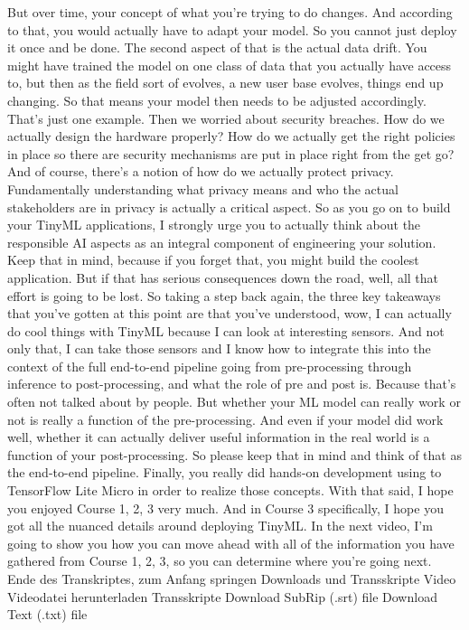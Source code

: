     But over time, your concept of what you're trying to do changes.
    And according to that, you would actually have to adapt your model.
    So you cannot just deploy it once and be done.
    The second aspect of that is the actual data drift.
    You might have trained the model on one class of data
    that you actually have access to, but then as the field sort of evolves,
    a new user base evolves, things end up changing.
    So that means your model then needs to be adjusted accordingly.
    That's just one example.
    Then we worried about security breaches.
    How do we actually design the hardware properly?
    How do we actually get the right policies in place
    so there are security mechanisms are put in place right from the get go?
    And of course, there's a notion of how do we actually protect privacy.
    Fundamentally understanding what privacy means
    and who the actual stakeholders are in privacy is actually a critical aspect.
    So as you go on to build your TinyML applications,
    I strongly urge you to actually think about the responsible AI aspects
    as an integral component of engineering your solution.
    Keep that in mind, because if you forget that,
    you might build the coolest application.
    But if that has serious consequences down the road,
    well, all that effort is going to be lost.
    So taking a step back again, the three key takeaways
    that you've gotten at this point are that you've understood,
    wow, I can actually do cool things with TinyML
    because I can look at interesting sensors.
    And not only that, I can take those sensors
    and I know how to integrate this into the context
    of the full end-to-end pipeline going from pre-processing
    through inference to post-processing, and what the role of pre and post is.
    Because that's often not talked about by people.
    But whether your ML model can really work or not is really
    a function of the pre-processing.
    And even if your model did work well, whether it can actually
    deliver useful information in the real world
    is a function of your post-processing.
    So please keep that in mind and think of that as the end-to-end pipeline.
    Finally, you really did hands-on development
    using to TensorFlow Lite Micro in order to realize those concepts.
    With that said, I hope you enjoyed Course 1, 2, 3 very much.
    And in Course 3 specifically, I hope you got all the nuanced details
    around deploying TinyML.
    In the next video, I'm going to show you how you can move ahead
    with all of the information you have gathered from Course 1, 2, 3,
    so you can determine where you're going next.
    Ende des Transkriptes, zum Anfang springen
    Downloads und Transskripte
    Video
    Videodatei herunterladen
    Transskripte
    Download SubRip (.srt) file
    Download Text (.txt) file    
    
